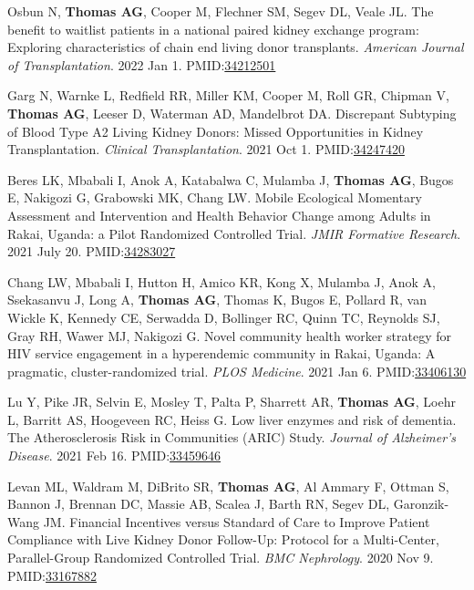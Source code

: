 \documentclass[10pt]{article}
\makeatletter
\newlength{\bibhang}
\newlength{\bibsep}
 {\@listi \global\bibsep\itemsep \global\advance\bibsep by\parsep}
\newenvironment{bibenum*}
  {\renewcommand\labelenumi{[\theenumi]}%
   \etaremune[
     topsep=0pt,
     itemsep=\bibsep,
     parsep=0pt,partopsep=0pt,
     itemindent=-\bibhang,
     leftmargin={\bibhang+\widthof{[999]}}]}
  {\endetaremune}
\newcommand{\pmid}[1]{PMID:\href{https://www.ncbi.nlm.nih.gov/pubmed/#1}{#1}}
\makeatother
\begin{document}
\begin{bibenum*}
\item Osbun N, \textbf{Thomas AG}, Cooper M, Flechner SM,
  Segev DL, Veale JL.
  The benefit to waitlist patients in a national paired kidney 
  exchange program: Exploring characteristics of chain end 
  living donor transplants.
  \emph{American Journal of Transplantation}. 2022 Jan 1.
  \pmid{34212501} 

\item Garg N, Warnke L, Redfield RR, Miller KM, Cooper M, Roll GR,
  Chipman V, \textbf{Thomas AG}, Leeser D, Waterman AD, 
  Mandelbrot DA. 
  Discrepant Subtyping of Blood Type A2 Living Kidney Donors: 
  Missed Opportunities in Kidney Transplantation.
  \emph{Clinical Transplantation}. 2021 Oct 1.
  \pmid{34247420} 

\item Beres LK, Mbabali I, Anok A, Katabalwa C,
  Mulamba J, \textbf{Thomas AG}, Bugos E, Nakigozi G,
  Grabowski MK, Chang LW.
  Mobile Ecological Momentary Assessment and Intervention 
  and Health Behavior Change among Adults in Rakai, 
  Uganda: a Pilot Randomized Controlled Trial.
  \emph{JMIR Formative Research}. 2021 July 20.
  \pmid{34283027} 

\item Chang LW, Mbabali I, Hutton H, Amico KR, Kong X, 
  Mulamba J, Anok A, Ssekasanvu J, Long A, \textbf{Thomas AG},
  Thomas K, Bugos E, Pollard R, van Wickle K, Kennedy CE,
  Serwadda D, Bollinger RC, Quinn TC, Reynolds SJ, Gray RH,
  Wawer MJ, Nakigozi G.
  Novel community health worker strategy for HIV service 
  engagement in a hyperendemic community in Rakai, Uganda: 
  A pragmatic, cluster-randomized trial.
  \emph{PLOS Medicine}. 2021 Jan 6.
  \pmid{33406130} 

\item Lu Y, Pike JR, Selvin E, Mosley T, Palta P, Sharrett AR, 
  \textbf{Thomas AG},
  Loehr L, Barritt AS, Hoogeveen RC, Heiss G. 
  Low liver enzymes and risk of dementia. 
  The Atherosclerosis Risk in Communities (ARIC) Study.
  \emph{Journal of Alzheimer's Disease}. 2021 Feb 16.
  \pmid{33459646} 

\item Levan ML, Waldram M,  DiBrito SR, \textbf{Thomas AG}, Al Ammary F,
  Ottman S, Bannon J, Brennan DC, Massie AB, Scalea J, Barth RN, Segev DL,
  Garonzik-Wang JM.
  Financial Incentives versus Standard of Care to Improve Patient Compliance
  with Live Kidney Donor Follow-Up: Protocol for a Multi-Center,
  Parallel-Group Randomized Controlled Trial.
  \emph{BMC Nephrology}. 2020 Nov 9.
  \pmid{33167882} 


\end{bibenum*}
\end{document}
